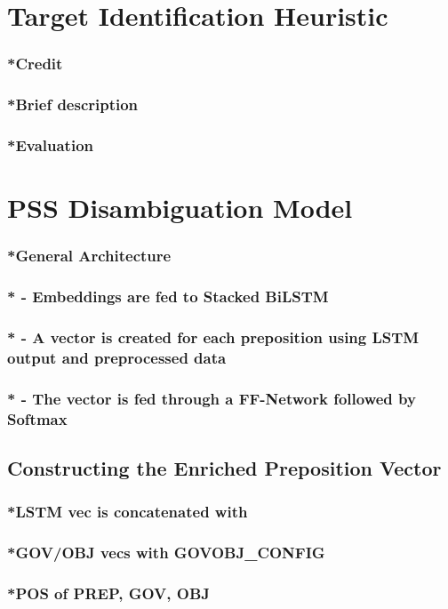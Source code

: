 \section{Target Identification Heuristic}
\subsubsection{*Credit}
\subsubsection{*Brief description}
\subsubsection{*Evaluation}

\section{PSS Disambiguation Model}
\subsubsection{*General Architecture}
\subsubsection{* - Embeddings are fed to Stacked BiLSTM}
\subsubsection{* - A vector is created for each preposition using LSTM output and preprocessed data}
\subsubsection{* - The vector is fed through a FF-Network followed by Softmax}
\pagebreak
\subsection{Constructing the Enriched Preposition Vector}
\subsubsection{*LSTM vec is concatenated with}
\subsubsection{*GOV/OBJ vecs with GOVOBJ\_CONFIG}
\subsubsection{*POS of PREP, GOV, OBJ}
